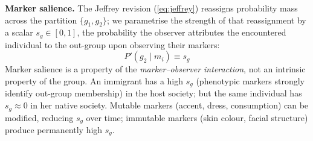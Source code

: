 \documentclass[12pt,a4paper]{article}
\theoremstyle{definition}
\numberwithin{proposition}{subsection}
\begin{document}
\textbf{Marker salience.} The Jeffrey revision (\ref{eq:jeffrey})
reassigns probability mass across the partition $\{g_1, g_2\}$; we
parametrise the strength of that reassignment by a scalar
$s_g \in [0,1]$, the probability the observer attributes the
encountered individual to the out-group upon observing their
markers:
\begin{equation}
  P'(g_2 \mid m_i) \equiv s_g
  \label{eq:salience}
\end{equation}
Marker salience is a property of the \emph{marker--observer
interaction}, not an intrinsic property of the group. An 
immigrant has a high $s_g$ (phenotypic markers strongly
identify out-group membership) in the host society; but the same individual has $s_g \approx 0$ in her native society. Mutable markers (accent, dress, consumption)
can be modified, reducing $s_g$ over time; immutable markers (skin
colour, facial structure) produce permanently high $s_g$.
\end{document}
